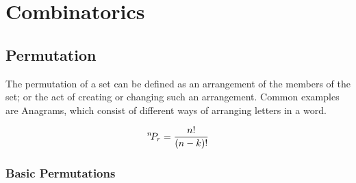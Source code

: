 \chapter{Combinatorics}


\section{Permutation} 
The permutation of a set can be defined as an arrangement of the members of the set; or the act of creating or changing such an arrangement. Common examples are Anagrams, which consist of different ways of arranging letters in a word.

\begin{equation}
    {}^{n}\!P_{r} = \frac{n!}{(n-k)!}
\end{equation}

\subsection{Basic Permutations}

